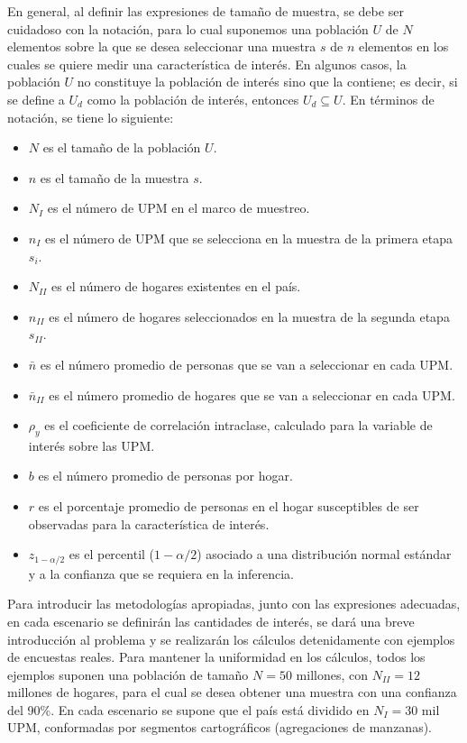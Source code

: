 \documentclass[
  12pt,
  spanish,
]{book}
\providecommand{\tightlist}{%
  \setlength{\itemsep}{0pt}\setlength{\parskip}{0pt}}
\begin{document}
En general, al definir las expresiones de tamaño de muestra, se debe ser cuidadoso con la notación, para lo cual suponemos una población \(U\) de \(N\) elementos sobre la que se desea seleccionar una muestra \(s\) de \(n\) elementos en los cuales se quiere medir una característica de interés. En algunos casos, la población \(U\) no constituye la población de interés sino que la contiene; es decir, si se define a \(U_d\) como la población de interés, entonces \(U_d \subseteq U\). En términos de notación, se tiene lo siguiente:

\begin{itemize}
\tightlist
\item
  \(N\) es el tamaño de la población \(U\).
\item
  \(n\) es el tamaño de la muestra \(s\).
\item
  \(N_{I}\) es el número de UPM en el marco de muestreo.
\item
  \(n_{I}\) es el número de UPM que se selecciona en la muestra de la primera etapa \(s_i\).
\item
  \(N_{II}\) es el número de hogares existentes en el país.
\item
  \(n_{II}\) es el número de hogares seleccionados en la muestra de la segunda etapa \(s_{II}\).
\item
  \(\bar{n}\) es el número promedio de personas que se van a seleccionar en cada UPM.
\item
  \(\bar{n}_{II}\) es el número promedio de hogares que se van a seleccionar en cada UPM.
\item
  \(\rho_y\) es el coeficiente de correlación intraclase, calculado para la variable de interés sobre las UPM.
\item
  \(b\) es el número promedio de personas por hogar.
\item
  \(r\) es el porcentaje promedio de personas en el hogar susceptibles de ser observadas para la característica de interés.
\item
  \(z_{1-\alpha/2}\) es el percentil (\(1- \alpha/2\)) asociado a una distribución normal estándar y a la confianza que se requiera en la inferencia.
\end{itemize}

Para introducir las metodologías apropiadas, junto con las expresiones adecuadas, en cada escenario se definirán las cantidades de interés, se dará una breve introducción al problema y se realizarán los cálculos detenidamente con ejemplos de encuestas reales. Para mantener la uniformidad en los cálculos, todos los ejemplos suponen una población de tamaño \(N=50\) millones, con \(N_{II} = 12\) millones de hogares, para el cual se desea obtener una muestra con una confianza del 90\%. En cada escenario se supone que el país está dividido en \(N_{I} =30\) mil UPM, conformadas por segmentos cartográficos (agregaciones de manzanas).
\end{document}
